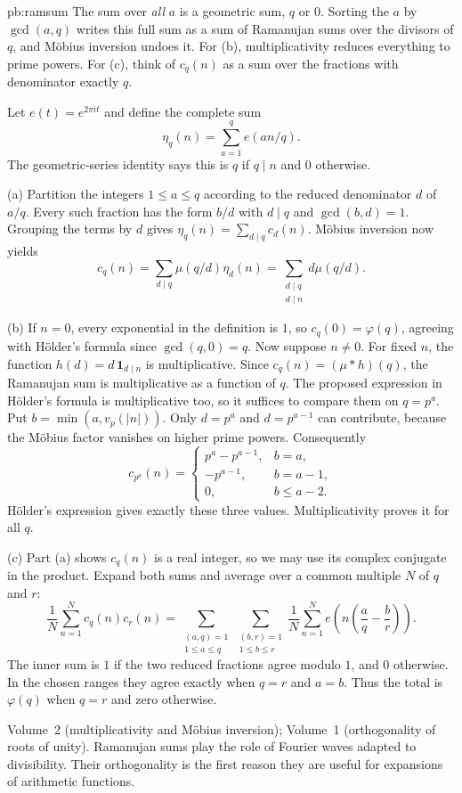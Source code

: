 \begin{solution}{pb:ramsum}
\idea The sum over \emph{all} $a$ is a geometric sum, $q$ or $0$. Sorting the $a$ by $\gcd(a,q)$ writes this full sum as a
sum of Ramanujan sums over the divisors of $q$, and Möbius inversion undoes it. For (b), multiplicativity reduces
everything to prime powers. For (c), think of $c_q(n)$ as a sum over the fractions with denominator exactly $q$.

\writeup Let $e(t)=e^{2\pi it}$ and define the complete sum
\[
\eta_q(n)=\sum_{a=1}^q e(an/q).
\]
The geometric-series identity says this is $q$ if $q\mid n$ and $0$ otherwise.

(a) Partition the integers $1\le a\le q$ according to the reduced denominator $d$ of $a/q$. Every such fraction has the form $b/d$ with $d\mid q$ and $\gcd(b,d)=1$. Grouping the terms by $d$ gives
$\eta_q(n)=\sum_{d\mid q}c_d(n)$. Möbius inversion now yields
\[
c_q(n)=\sum_{d\mid q}\mu(q/d)\eta_d(n)
=\sum_{\substack{d\mid q\\d\mid n}}d\mu(q/d).
\]

(b) If $n=0$, every exponential in the definition is $1$, so $c_q(0)=\varphi(q)$, agreeing with Hölder's formula since $\gcd(q,0)=q$. Now suppose $n\ne0$. For fixed $n$, the function $h(d)=d\,\mathbf1_{d\mid n}$ is multiplicative. Since $c_q(n)=(\mu*h)(q)$, the Ramanujan sum is multiplicative as a function of $q$. The proposed expression in Hölder's formula is multiplicative too, so it suffices to compare them on $q=p^a$. Put $b=\min(a,v_p(|n|))$. Only $d=p^a$ and $d=p^{a-1}$ can contribute, because the Möbius factor vanishes on higher prime powers. Consequently
\[
c_{p^a}(n)=
\begin{cases}
p^a-p^{a-1},&b=a,\\
-p^{a-1},&b=a-1,\\
0,&b\le a-2.
\end{cases}
\]
Hölder's expression gives exactly these three values. Multiplicativity proves it for all $q$.

(c) Part (a) shows $c_q(n)$ is a real integer, so we may use its complex conjugate in the product. Expand both sums and average over a common multiple $N$ of $q$ and $r$:
\[
\frac1N\sum_{n=1}^Nc_q(n)c_r(n)
=\sum_{\substack{(a,q)=1\\1\le a\le q}}
 \sum_{\substack{(b,r)=1\\1\le b\le r}}
 \frac1N\sum_{n=1}^N e\left(n\left(\frac aq-\frac br\right)\right).
\]
The inner sum is $1$ if the two reduced fractions agree modulo $1$, and $0$ otherwise. In the chosen ranges they agree exactly when $q=r$ and $a=b$. Thus the total is $\varphi(q)$ when $q=r$ and zero otherwise.

\tools Volume~2 (multiplicativity and Möbius inversion); Volume~1 (orthogonality of roots of unity).
\leads Ramanujan sums play the role of Fourier waves adapted to divisibility. Their orthogonality is the first reason they are useful for expansions of arithmetic functions.
\end{solution}

